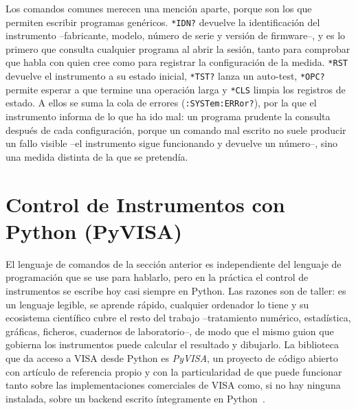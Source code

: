 Los comandos comunes merecen una mención aparte, porque son los que permiten escribir programas genéricos. \texttt{*IDN?} devuelve la identificación del instrumento --fabricante, modelo, número de serie y versión de firmware--, y es lo primero que consulta cualquier programa al abrir la sesión, tanto para comprobar que habla con quien cree como para registrar la configuración de la medida. \texttt{*RST} devuelve el instrumento a su estado inicial, \texttt{*TST?} lanza un auto-test, \texttt{*OPC?} permite esperar a que termine una operación larga y \texttt{*CLS} limpia los registros de estado. A ellos se suma la cola de errores (\texttt{:SYSTem:ERRor?}), por la que el instrumento informa de lo que ha ido mal: un programa prudente la consulta después de cada configuración, porque un comando mal escrito no suele producir un fallo visible --el instrumento sigue funcionando y devuelve un número--, sino una medida distinta de la que se pretendía.


\section{Control de Instrumentos con Python (PyVISA)}\label{sec:pyvisa}

El lenguaje de comandos de la sección anterior es independiente del lenguaje de programación que se use para hablarlo, pero en la práctica el control de instrumentos se escribe hoy casi siempre en Python. Las razones son de taller: es un lenguaje legible, se aprende rápido, cualquier ordenador lo tiene y su ecosistema científico cubre el resto del trabajo --tratamiento numérico, estadística, gráficas, ficheros, cuadernos de laboratorio--, de modo que el mismo guion que gobierna los instrumentos puede calcular el resultado y dibujarlo. La biblioteca que da acceso a VISA desde Python es \emph{PyVISA}, un proyecto de código abierto con artículo de referencia propio y con la particularidad de que puede funcionar tanto sobre las implementaciones comerciales de VISA como, si no hay ninguna instalada, sobre un backend escrito íntegramente en Python~\cite{grecco2023pyvisa,visa_vpp43}.

